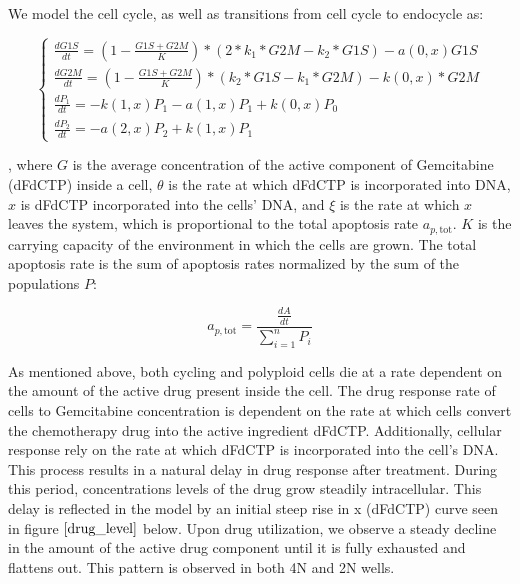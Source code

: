 \documentclass[11pt,notitlepage]{article}
\newcommand{\diff}[2]{\frac{d #1}{d #2}}
\begin{document}
We model the cell cycle, as well as transitions from cell cycle to endocycle as:


\begin{equation}\label{cellcycle}
\begin{cases}
    \frac{dG1S}{dt} = (1 - \frac{G1S + G2M}{K}) * (2 * k_1 * G2M - k_2 * G1S) - a(0, x) G1S \\
    \frac{dG2M}{dt} = (1 - \frac{G1S + G2M}{K}) *(k_2 * G1S - k_1 * G2M) - k(0, x) * G2M \\
    \frac{dP_1}{dt} = - k(1, x) P_1 - a(1, x) P_1 + 
    k(0, x) P_{0}  \\
    \frac{dP_2}{dt} = - a(2, x) P_2 + 
    k(1, x) P_{1} 
\end{cases}
\end{equation}





, where $G$ is the average concentration of the active component of Gemcitabine (dFdCTP) inside a cell, $\theta$ is the rate at which dFdCTP is incorporated into DNA, $x$ is dFdCTP incorporated into the cells' DNA, and $\xi$ is the rate at which $x$ leaves the system, which is proportional to the total apoptosis rate  \( a_{p,\text{tot}} \). $K$ is the carrying capacity of the environment in which the cells are grown. The total apoptosis rate is the sum of apoptosis rates normalized by the sum of the populations \( P \):

\begin{equation}
a_{p,\text{tot}} = \frac{ \frac{dA}{dt} }{\sum_{i=1}^{n} P_i}
\end{equation}

As mentioned above, both cycling and polyploid cells die at a rate dependent on the amount of the active drug present inside the cell. The drug response rate of  cells to Gemcitabine concentration is dependent on the rate at which cells convert the chemotherapy drug into the active ingredient dFdCTP. Additionally, cellular response rely on the  rate at which dFdCTP is incorporated  into the cell’s DNA. This process results in a natural delay in drug response after treatment. During  this period, concentrations levels of the drug  grow steadily intracellular. This delay is reflected in the model by an  initial steep rise in x (dFdCTP) curve seen in figure $\ref{drug_level}$  below. Upon drug  utilization,  we observe a steady decline in the amount of the active drug component until it is fully exhausted and flattens out. This pattern is observed in both 4N and 2N wells.
\end{document}
